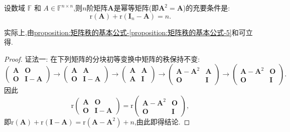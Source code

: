 \documentclass[../../main.tex]{subfiles}%
\begin{document}
\begin{proposition}[幂等矩阵关于秩的判定准则]\label{proposition:幂等矩阵关于秩的判定准则}
设数域 $\mathbb{F}$ 和 $A \in \mathbb{F}^{n \times n}$,则\(n\)阶矩阵\(\boldsymbol{A}\)是幂等矩阵(即\(\boldsymbol{A}^2 = \boldsymbol{A}\))的充要条件是:
\[
\mathrm{r}(\boldsymbol{A})+\mathrm{r}(\boldsymbol{I}_n - \boldsymbol{A}) = n.
\]
\end{proposition}
\begin{note}
实际上,由\hyperref[proposition:矩阵秩的基本公式-5]{proposition:矩阵秩的基本公式-\ref{proposition:矩阵秩的基本公式-5}}和可立得.
\end{note}
\begin{proof}

{\color{blue}证法一:}
在下列矩阵的分块初等变换中矩阵的秩保持不变:
\[
\begin{pmatrix}
\boldsymbol{A}&\boldsymbol{O}\\
\boldsymbol{O}&\boldsymbol{I}-\boldsymbol{A}
\end{pmatrix}\to
\begin{pmatrix}
\boldsymbol{A}&\boldsymbol{A}\\
\boldsymbol{O}&\boldsymbol{I}-\boldsymbol{A}
\end{pmatrix}\to
\begin{pmatrix}
\boldsymbol{A}&\boldsymbol{A}\\
\boldsymbol{A}&\boldsymbol{I}
\end{pmatrix}\to
\begin{pmatrix}
\boldsymbol{A}-\boldsymbol{A}^2&\boldsymbol{A}\\
\boldsymbol{O}&\boldsymbol{I}
\end{pmatrix}\to
\begin{pmatrix}
\boldsymbol{A}-\boldsymbol{A}^2&\boldsymbol{O}\\
\boldsymbol{O}&\boldsymbol{I}
\end{pmatrix}.
\]
因此
\[
\mathrm{r}\begin{pmatrix}
\boldsymbol{A}&\boldsymbol{O}\\
\boldsymbol{O}&\boldsymbol{I}-\boldsymbol{A}
\end{pmatrix}=\mathrm{r}\begin{pmatrix}
\boldsymbol{A}-\boldsymbol{A}^2&\boldsymbol{O}\\
\boldsymbol{O}&\boldsymbol{I}
\end{pmatrix},
\]
即\(\mathrm{r}(\boldsymbol{A})+\mathrm{r}(\boldsymbol{I}-\boldsymbol{A})=\mathrm{r}(\boldsymbol{A}-\boldsymbol{A}^2)+n\),由此即得结论.


\end{proof}
\end{document}
